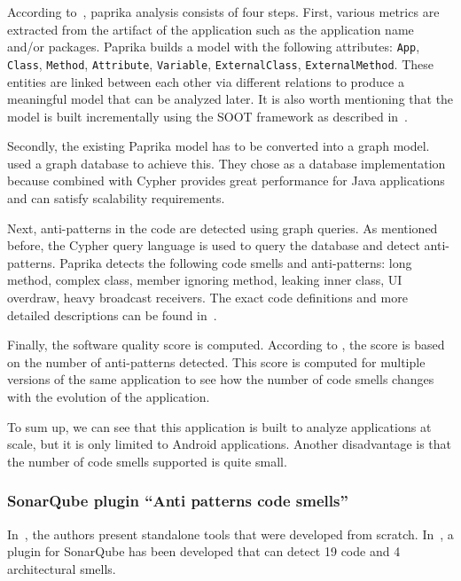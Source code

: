 According to~\citeauthor{paprika-paper}, paprika analysis consists of four steps.
First, various metrics are extracted from the artifact of the application such as the application name and/or packages.
Paprika builds a model with the following attributes: \texttt{App}, \texttt{Class}, \texttt{Method}, \texttt{Attribute},
\texttt{Variable}, \texttt{ExternalClass}, \texttt{ExternalMethod}.
These entities are linked between each other via different relations to produce a meaningful model that can be
analyzed later.
It is also worth mentioning that the model is built incrementally using the SOOT framework as described in~\cite{paprika-paper}.

Secondly, the existing Paprika model has to be converted into a graph model.
~\citeauthor{paprika-paper} used a graph database to achieve this.
They chose \citet{neo4j} as a database implementation because \citet{neo4j} combined with
Cypher provides great performance for Java applications and can satisfy scalability requirements.

Next, anti-patterns in the code are detected using graph queries.
As mentioned before, the Cypher query language is used to query the database and detect anti-patterns.
Paprika detects the following code smells and anti-patterns: long method, complex class, member ignoring method,
leaking inner class, UI overdraw, heavy broadcast receivers.
The exact code definitions and more detailed descriptions can be found in~\cite{paprika-paper}.

Finally, the software quality score is computed.
According to \citeauthor{paprika-paper}, the score is based on the number of anti-patterns detected.
This score is computed for multiple versions of the same application to see how the number of code smells changes with the evolution
of the application.

To sum up, we can see that this application is built to analyze applications at scale, but it is only limited
to Android applications.
Another disadvantage is that the number of code smells supported is quite small.

\subsubsection{SonarQube plugin ``Anti patterns code smells''}

In~\cite{mannan2016understanding,paprika-paper}, the authors present standalone tools that
were developed from scratch.
In~\cite{sonar-plugin-external}, a plugin for SonarQube has been developed that can detect 19 code and 4
architectural smells.

